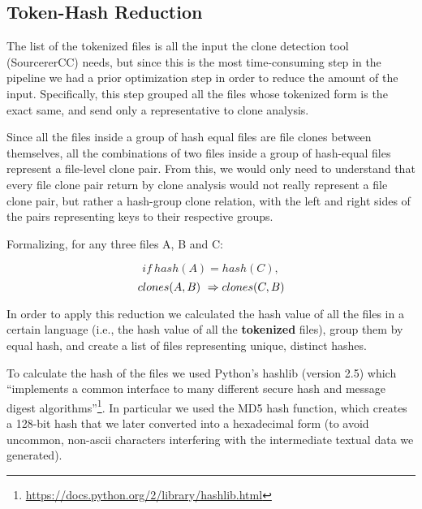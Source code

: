 \subsection{Token-Hash Reduction}

The list of the tokenized files is all the input the clone detection tool (SourcererCC) needs, but since this is the most time-consuming step in the pipeline  we had a prior optimization step in order to reduce the amount of the input. Specifically, this step grouped all the files whose tokenized form is the exact same, and send only a representative to clone analysis.

Since all the files inside a group of hash equal files are file clones between themselves, all the combinations of two files inside a group of hash-equal files represent a file-level clone pair. From this, we would only need to understand that every file clone pair return by clone analysis would not really represent a file clone pair, but rather a hash-group clone relation, with the left and right sides of the pairs representing keys to their respective groups.

Formalizing, for any three files A, B and C:

$$ if\ hash(A) = hash(C),$$ $$\\ clones(A,B)\ \Rightarrow clones(C,B) $$

In order to apply this reduction we calculated the hash value of all the files in a certain language (i.e., the hash value of all the \textbf{tokenized} files), group them by equal hash, and create a list of files representing unique, distinct hashes.

To calculate the hash of the files we used Python's hashlib (version 2.5) which ``implements a common interface to many different secure hash and message digest algorithms''\footnote{\url{https://docs.python.org/2/library/hashlib.html}}. In particular we used the MD5 hash function, which creates a 128-bit hash that we later converted into a hexadecimal form (to avoid uncommon, non-ascii characters interfering with the intermediate textual data we generated).



